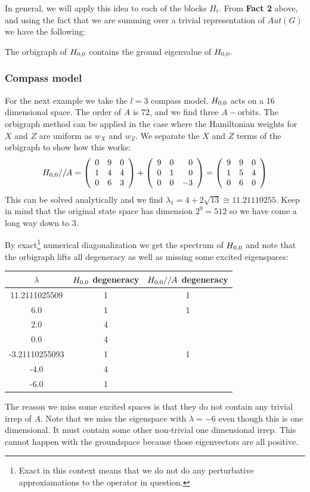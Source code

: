 In general, we will apply this idea to each of the blocks $H_t$.
From {\bf Fact 2} above, and using the fact that we are
summing over a trivial representation of $Aut(G)$ we have the following:
\begin{framed}

The orbigraph of $H_{0,0}$ contains the ground eigenvalue of $H_{0,0}.$
\end{framed}

%
\subsubsection{Compass model}
For the next example we take the $l=3$ compass model.
$H_{0,0}$ acts on a 16 dimensional space.
The order of $A$ is $72$, and we find three $A-$orbits.
The orbigraph method can be applied in the case
where the Hamiltonian weights for $X$ and $Z$ are uniform as $w_X$ and $w_Z.$
We separate the $X$ and $Z$ terms of the orbigraph to show
how this works:
$$
H_{0,0}//A = 
\left(\begin{array}{rrr}
 0 &  9 &  0 \cr
  1 &  4 &  4 \cr
  0 &  6 &  3
\end{array}\right) + 
\left(\begin{array}{rrr}
 9 &  0 &  0 \cr
  0 &  1 &  0 \cr
  0 &  0 &  -3
\end{array}\right)
=
\left(\begin{array}{rrr}
 9 &  9 &  0 \cr
  1 &  5 &  4 \cr
  0 &  6 &  0
\end{array}\right)
$$
This can be solved analytically and we find $\lambda_1 = 4+2\sqrt{13} \cong 11.21110255.$
Keep in mind that the original state space has dimension $2^9=512$ so we
have come a long way down to 3.

By exact\footnote{Exact in this context means that we do not do any
perturbative approxiamations to the operator in question.}
numerical diagonalization
we get the spectrum of $H_{0,0}$ and note that the orbigraph lifts
all degeneracy as well as missing some excited eigenspaces:
\begin{center}
\begin{tabular}{ c|c|c } 
$\lambda$ & $H_{0,0}$ degeneracy & $H_{0,0}//A$ degeneracy \\
\hline
    11.2111025509 & 1 & 1 \\
    6.0 & 1 & 1 \\
    2.0 & 4 &   \\
    0.0 & 4 &   \\
    -3.21110255093 & 1 & 1 \\
    -4.0 & 4 &   \\
    -6.0 & 1 &   
\end{tabular}
\end{center}
The reason we miss some excited spaces is that they do not contain
any trivial irrep of $A.$
Note that we miss the eigenspace with $\lambda = -6$
even though this is one dimensional. It must contain some other non-trivial
one dimensional irrep. This cannot happen with the groundspace because
those eigenvectors are all positive.

